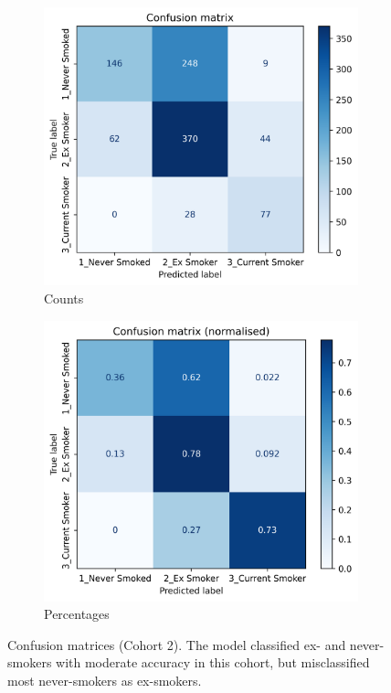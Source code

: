 \documentclass{article} %
\begin{document}
\begin{figure}[p]
    \centering
    \begin{subfigure}{0.49\linewidth}
        \centering
        \includegraphics[width=\linewidth]{cohort2/test_confusion_matrix.png}
        \caption{Counts}
    \end{subfigure}
    \hfill
    \begin{subfigure}{0.49\linewidth}
        \centering
        \includegraphics[width=\linewidth]{cohort2/test_confusion_matrix_normalised.png}
        \caption{Percentages}
    \end{subfigure}
    \caption[Confusion matrices (Cohort 2)]{Confusion matrices (Cohort 2). The model classified ex- and never-smokers with moderate accuracy in this cohort, but misclassified most never-smokers as ex-smokers.}
    \label{fig:cohort2-confusion-matrix}
\end{figure}
\end{document}
